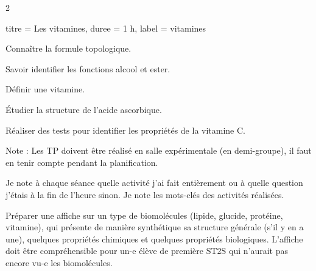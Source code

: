 \begin{multicols}{2}
  \begin{TP}{titre = Les vitamines, duree = 1 h, label = vitamines}
    \begin{prerequis}
      \item Connaître la formule topologique.
      \item Savoir identifier les fonctions alcool et ester.
    \end{prerequis}
    \begin{objectifs}
      \item Définir une vitamine.
      \item Étudier la structure de l'acide ascorbique.
      \item Réaliser des tests pour identifier les propriétés de la vitamine C.
    \end{objectifs}
  \end{TP}
\end{multicols}


Note :
Les TP doivent être réalisé en salle expérimentale (en demi-groupe), il faut en tenir compte pendant la planification.


\newpage
\nomPrenomClasse
{}
\medskip

Je note à chaque séance quelle activité j'ai fait entièrement ou à quelle question j'étais à la fin de l'heure sinon.
Je note les mots-clés des activités réalisées.
\medskip


\begin{programmeSeance}
  \seance \seance \seance
\end{programmeSeance}

\begin{programmeSeance}[nombre = 3, distance = 0 pt]
  \seance
\end{programmeSeance}


\begin{tacheFinale}
  Préparer une affiche  sur un type de biomolécules (lipide, glucide, protéine, vitamine), qui présente de manière synthétique sa structure générale  (s'il y en a une), quelques propriétés chimiques et quelques propriétés biologiques.
  L'affiche doit être compréhensible pour un-e élève de première \textsc{ST2S} qui n'aurait pas encore vu-e les biomolécules.
\end{tacheFinale}


